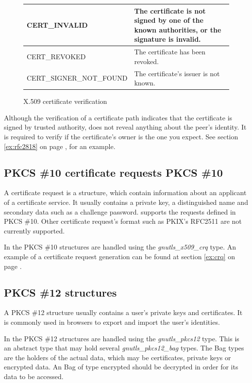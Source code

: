 \begin{figure}[hbtp]
\begin{tabular}{|l|p{7cm}|}

\hline
CERT\_INVALID & The certificate is not signed by one of the known authorities, or
the signature is invalid.
\\
\hline
CERT\_REVOKED & The certificate has been revoked.
\\
\hline
CERT\_SIGNER\_NOT\_FOUND & The certificate's issuer is not known.
\\
\hline
\end{tabular}
\caption{X.509 certificate verification}
\label{fig:verify}
\end{figure}

\par
Although the verification of a certificate path indicates that the
certificate is signed by trusted authority, does not reveal anything
about the peer's identity. It is required to verify if the certificate's
owner is the one you expect. See section \ref{ex:rfc2818} on page \pageref{ex:rfc2818},
for an example.


\subsection{PKCS \#10 certificate requests\index
{PKCS \#10}}
A certificate request is a structure, which
contain information about an applicant of a certificate service.
It usually contains a private key, a distinguished name and secondary
data such as a challenge password. \gnutls{} supports the requests
defined in PKCS \#10. Other certificate request's format such as
PKIX's RFC2511 are not currently supported.

In \gnutls{} the PKCS \#10 structures are handled using the
\emph{gnutls\_x509\_crq} type. 
An example of a certificate request generation can be found at section \ref{ex:crq}
on page \pageref{ex:crq}.

\subsection{PKCS \#12 structures}
A PKCS \#12 structure usually contains a user's private keys and
certificates. It is commonly used in browsers to export and import
the user's identities.
\par
In \gnutls{} the PKCS \#12 structures are handled using the
\emph{gnutls\_pkcs12} type. This is an abstract type that
may hold several \emph{gnutls\_pkcs12\_bag} types. The Bag types are the
holders of the actual data, which may be certificates, private
keys or encrypted data. An Bag of type encrypted should be decrypted
in order for its data to be accessed. 

